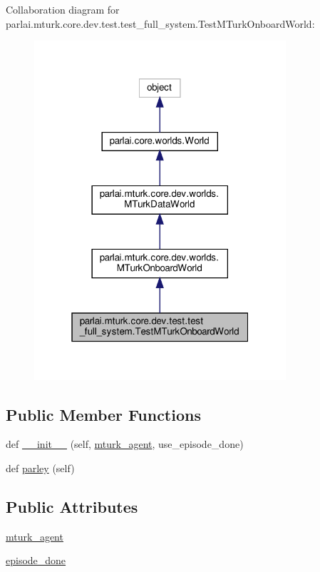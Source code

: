 Collaboration diagram for parlai.\+mturk.\+core.\+dev.\+test.\+test\+\_\+full\+\_\+system.\+Test\+M\+Turk\+Onboard\+World\+:\nopagebreak
\begin{figure}[H]
\begin{center}
\leavevmode
\includegraphics[width=265pt]{dc/dc8/classparlai_1_1mturk_1_1core_1_1dev_1_1test_1_1test__full__system_1_1TestMTurkOnboardWorld__coll__graph}
\end{center}
\end{figure}
\subsection*{Public Member Functions}
\begin{DoxyCompactItemize}
\item 
def \hyperlink{classparlai_1_1mturk_1_1core_1_1dev_1_1test_1_1test__full__system_1_1TestMTurkOnboardWorld_a4488b20bd652972be39ed450e41cc5ff}{\+\_\+\+\_\+init\+\_\+\+\_\+} (self, \hyperlink{classparlai_1_1mturk_1_1core_1_1dev_1_1test_1_1test__full__system_1_1TestMTurkOnboardWorld_a57ab0490a71d0e7df3aeaf7d9d162dc9}{mturk\+\_\+agent}, use\+\_\+episode\+\_\+done)
\item 
def \hyperlink{classparlai_1_1mturk_1_1core_1_1dev_1_1test_1_1test__full__system_1_1TestMTurkOnboardWorld_a871930078d22c4519f130db54870d0f7}{parley} (self)
\end{DoxyCompactItemize}
\subsection*{Public Attributes}
\begin{DoxyCompactItemize}
\item 
\hyperlink{classparlai_1_1mturk_1_1core_1_1dev_1_1test_1_1test__full__system_1_1TestMTurkOnboardWorld_a57ab0490a71d0e7df3aeaf7d9d162dc9}{mturk\+\_\+agent}
\item 
\hyperlink{classparlai_1_1mturk_1_1core_1_1dev_1_1test_1_1test__full__system_1_1TestMTurkOnboardWorld_aef494264d564ac5e4f1170323bcc627b}{episode\+\_\+done}
\end{DoxyCompactItemize}


